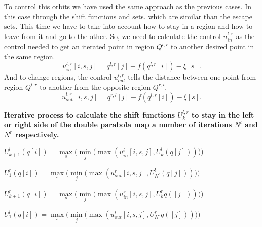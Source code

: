 To control this orbits we have used the same approach as the previous cases. In this case through the shift functions and sets. which are similar than the escape sets. This time we have to take into account how to stay in a region and how to leave from it and go to the other. So, we need to calculate the control $u_{in}^{l,r}$ as the control needed to get an iterated point in region $Q^{l,r}$ to another desired point in the same region.
\begin{equation*}
u_{in}^{l,r}[i,s,j] =  q^{l,r}[j] - f(q^{l,r}[i]) - \xi[s].
\end{equation*}
And to change regions, the control $u_{out}^{l,r}$ tells the distance between one point from region $Q^{l,r}$ to another from the opposite region $Q^{r,l}$.
\begin{equation*}
u_{out}^{l,r}[i,s,j] = q^{r,l}[j] - f(q^{l,r}[i]) - \xi[s].
\end{equation*}



\begin{algorithm}[h!]
    \caption{\textbf{Iterative process to calculate the shift functions $U^{l,r}_{k}$ to stay in the left or right side of the double parabola map a number of iterations $N^l$ and $N^r$ respectively.} }
    \label{alg:ShiftFunction}
\renewcommand{\thealgorithm}{}

\begin{algorithmic}[0]
    

          \State  $U^{l}_{k+1}(q[i])=\max\limits_s\Big(\min\limits_j\big(\max(u_{in}^l[i,s,j],U^l_k(q[j]))\big)\Big)$

        \EndFor
    
       \State   $U^{r}_{1}(q[i])=\max\limits_s\Big(\min\limits_j\big(\max(u_{out}^r[i,s,j],U^l_{N^l}(q[j]))\big)\Big)$   
        
        
            \State  $U^{r}_{k+1}(q[i])=\max\limits_s\Big(\min\limits_j\big(\max(u_{in}^r[i,s,j],U^r_kq([j]))\big)\Big)$
            
        \EndFor
        
        \State  $U^{l}_{1}(q[i])=\max\limits_s\Big(\min\limits_j\big(\max(u_{out}^l[i,s,j],U^r_{N^r}q([j]))\big)\Big)$
    \EndWhile
    \end{algorithmic}
\end{algorithm}



